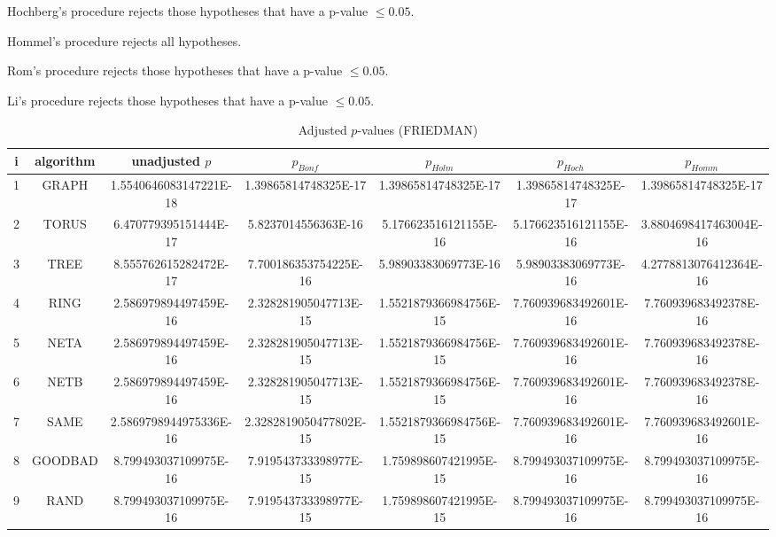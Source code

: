 \documentclass[a4paper,10pt]{article}
\begin{document}
\begin{landscape}
Hochberg's procedure rejects those hypotheses that have a p-value $\le0.05$.


Hommel's procedure rejects all hypotheses.


Rom's procedure rejects those hypotheses that have a p-value $\le0.05$.


Li's procedure rejects those hypotheses that have a p-value $\le0.05$.



\newpage

\begin{table}[!htp]
\centering\scriptsize
\caption{Adjusted $p$-values (FRIEDMAN)}
\begin{tabular}{ccccccc}
i&algorithm&unadjusted $p$&$p_{Bonf}$&$p_{Holm}$&$p_{Hoch}$&$p_{Homm}$\\
\hline
1& GRAPH&1.5540646083147221E-18&1.39865814748325E-17&1.39865814748325E-17&1.39865814748325E-17&1.39865814748325E-17\\
2& TORUS&6.470779395151444E-17&5.8237014556363E-16&5.176623516121155E-16&5.176623516121155E-16&3.8804698417463004E-16\\
3& TREE&8.555762615282472E-17&7.700186353754225E-16&5.98903383069773E-16&5.98903383069773E-16&4.2778813076412364E-16\\
4& RING&2.586979894497459E-16&2.328281905047713E-15&1.5521879366984756E-15&7.760939683492601E-16&7.760939683492378E-16\\
5& NETA&2.586979894497459E-16&2.328281905047713E-15&1.5521879366984756E-15&7.760939683492601E-16&7.760939683492378E-16\\
6& NETB&2.586979894497459E-16&2.328281905047713E-15&1.5521879366984756E-15&7.760939683492601E-16&7.760939683492378E-16\\
7& SAME&2.5869798944975336E-16&2.3282819050477802E-15&1.5521879366984756E-15&7.760939683492601E-16&7.760939683492601E-16\\
8& GOODBAD&8.799493037109975E-16&7.919543733398977E-15&1.759898607421995E-15&8.799493037109975E-16&8.799493037109975E-16\\
9& RAND&8.799493037109975E-16&7.919543733398977E-15&1.759898607421995E-15&8.799493037109975E-16&8.799493037109975E-16\\
\hline
\end{tabular}
\end{table}


\end{landscape}
\end{document}
